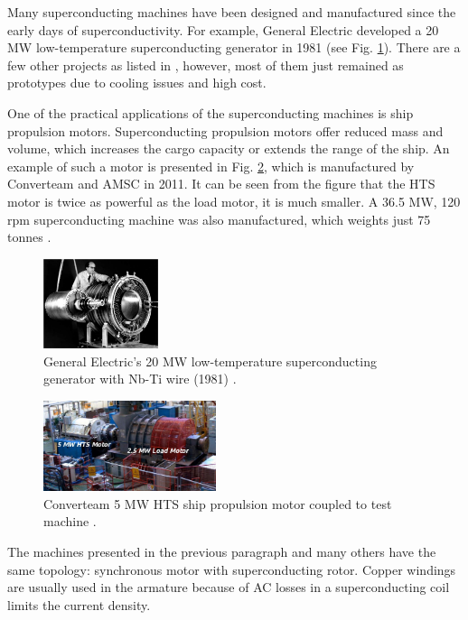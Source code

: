 \documentclass[12pt]{IET02}
\begin{document}
Many superconducting machines have been designed and manufactured since the early days of superconductivity. For example, General Electric developed a 20 MW low-temperature superconducting generator in 1981 (see Fig. \ref{GE_LTS_machine}). There are a few other projects as listed in \cite{Barnes2005}, however, most of them just remained as prototypes due to cooling issues and high cost.

One of the practical applications of the superconducting machines is ship propulsion motors. Superconducting propulsion motors offer reduced mass and volume, which increases the cargo capacity or extends the range of the ship. An example of such a motor is presented in Fig. \ref{converteam_5MW}, which is manufactured by Converteam and AMSC in 2011. It can be seen from the figure that the HTS motor is twice as powerful as the load motor, it is much smaller. A 36.5 MW, 120 rpm superconducting machine was also manufactured, which weights just 75 tonnes \citep{Gamble2011}.

  \begin{figure}[]
    \centering
    \includegraphics[width=0.3\textwidth]{GE_LTS_machine}
    \caption{General Electric's 20 MW low-temperature superconducting generator with Nb-Ti wire (1981) \cite{Barnes2005}.} 
    \label{GE_LTS_machine}
  \end{figure}

  \begin{figure}[]
    \centering
    \includegraphics[width=0.45\textwidth]{converteam_5MW}
    \caption{Converteam 5 MW HTS ship propulsion motor coupled to test machine  \cite{Kalsi2004h}.} 
    \label{converteam_5MW}
  \end{figure}

The machines presented in the previous paragraph and many others have the same topology: synchronous motor with superconducting rotor. Copper windings are usually used in the armature because of AC losses in a superconducting coil limits the current density. 
\end{document}
